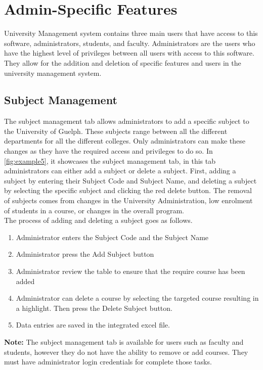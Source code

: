 \newpage
\section{Admin-Specific Features}

University Management system contains three main users that have access to this software, administrators, students, and faculty. Administrators are the users who have the highest level of privileges between all users with access to this software. They allow for the addition and deletion of specific features and users in the university management system.


\subsection{Subject Management}

The subject management tab allows administrators to add a specific subject to the University of Guelph. These subjects range between all the different departments for all the different colleges. Only administrators can make these changes as they have the required access and privileges to do so. In \autoref{fig:example5}, it showcases the subject management tab, in this tab administrators can either add a subject or delete a subject. First, adding a subject by entering their Subject Code and Subject Name, and deleting a subject by selecting the specific subject and clicking the red delete button. The removal of subjects comes from changes in the University Administration, low enrolment of students in a course, or changes in the overall program. \\

The process of adding and deleting a subject goes as follows.
\begin{enumerate}
    \item Administrator enters the Subject Code and the Subject Name
    \item Administrator press the Add Subject button
    \item Administrator review the table to ensure that the require course has been added
    \item Administrator can delete a course by selecting the targeted course resulting in a highlight. Then press the Delete Subject button.
    \item Data entries are saved in the integrated excel file.
\end{enumerate}

\textbf{Note:} The subject management tab is available for users such as faculty and students, however they do not have the ability to remove or add courses. They must have administrator login credentials for complete those tasks. 

